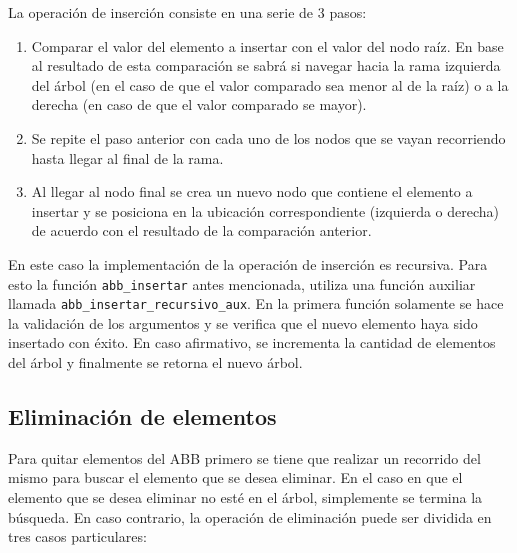 \documentclass[titlepage,a4paper]{article}
\begin{document}
La operación de inserción consiste en una serie de 3 pasos:

\begin{enumerate}
	\item Comparar el valor del elemento a insertar con el valor del nodo raíz.
		En base al resultado de esta comparación se sabrá si navegar hacia la rama
		izquierda del árbol (en el caso de que el valor comparado sea menor al de
		la raíz) o a la derecha (en caso de que el valor comparado se mayor).
	\item Se repite el paso anterior con cada uno de los nodos que se vayan 
		recorriendo hasta llegar al final de la rama.
	\item Al llegar al nodo final se crea un nuevo nodo que contiene el elemento
		a insertar y se posiciona en la ubicación correspondiente (izquierda o
		derecha) de acuerdo con el resultado de la comparación anterior.
\end{enumerate}

En este caso la implementación de la operación de inserción es recursiva. Para
esto la función \lstinline{abb_insertar} antes mencionada, utiliza una función
auxiliar llamada \lstinline{abb_insertar_recursivo_aux}. En la primera función
solamente se hace la validación de los argumentos y se verifica que el nuevo
elemento haya sido insertado con éxito. En caso afirmativo, se incrementa la
cantidad de elementos del árbol y finalmente se retorna el nuevo árbol.


										 \subsection{Eliminación de elementos}

Para quitar elementos del ABB primero se tiene que realizar un recorrido del
mismo para buscar el elemento que se desea eliminar. En el caso en que el
elemento que se desea eliminar no esté en el árbol, simplemente se termina
la búsqueda. En caso contrario, la operación de eliminación puede ser dividida
en tres casos particulares:
\end{document}
